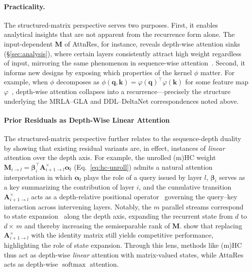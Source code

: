 \paragraph{Practicality.}
The structured-matrix perspective serves two purposes.
First, it enables analytical insights that are not apparent from the recurrence form alone.
The input-dependent $\mathbf{M}$ of AttnRes, for instance, reveals depth-wise attention sinks (\S\ref{sec:analysis}), where certain layers consistently attract high weight regardless of input, mirroring the same phenomenon in sequence-wise attention~\cite{xiao2023efficient}.
Second, it informs new designs by exposing which properties of the kernel $\phi$ matter.
For example, when $\phi$ decomposes as $\phi(\bm{q}, \bm{k}) = \varphi(\bm{q})^\top \varphi(\bm{k})$ for some feature map $\varphi$~\cite{katharopoulos-2020-transformers}, depth-wise attention collapses into a recurrence---precisely the structure underlying the MRLA--GLA and DDL--DeltaNet correspondences noted above.

\paragraph{Prior Residuals as Depth-Wise Linear Attention}

The structured-matrix perspective further relates to the sequence-depth duality by showing that existing residual variants are, in effect, instances of \emph{linear} attention over the depth axis.
For example, the unrolled (m)HC weight $\mathbf{M}_{i \to l} = \boldsymbol{\beta}_i^\top \mathbf{A}_{i+1 \to l}^\times \boldsymbol{\alpha}_l$ (Eq.~\ref{eq:hc-unroll}) admits a natural attention interpretation in which $\boldsymbol{\alpha}_l$ plays the role of a query issued by layer $l$, $\boldsymbol{\beta}_i$ serves as a key summarizing the contribution of layer $i$, and the cumulative transition $\mathbf{A}_{i+1 \to l}^\times$ acts as a depth-relative positional operator~\cite{zhang2025kimi} governing the query--key interaction across intervening layers.
Notably, the $m$ parallel streams correspond to state expansion~\cite{qin-2024-hgrn2,mak2025residualmatrix} along the depth axis, expanding the recurrent state from $d$ to $d {\times}\, m$ and thereby increasing the semiseparable rank of $\mathbf{M}$.
\cite{xie2026mhcidentity} show that replacing $\mathbf{A}_{i+1 \to l}^{\times}$ with the identity matrix still yields competitive performance, highlighting the role of state expansion.
Through this lens, methods like (m)HC thus act as depth-wise \emph{linear} attention with matrix-valued states, while AttnRes acts as depth-wise $\operatorname{softmax}$ attention.





